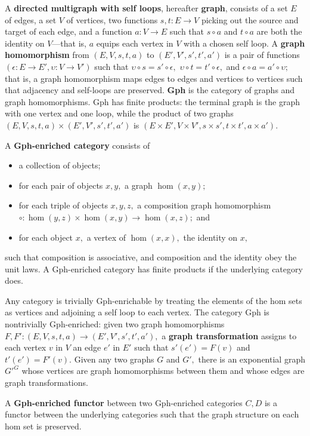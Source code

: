 \documentclass[submission,copyright,creativecommons]{eptcs}
\newcommand{\maps}{\colon}
\begin{document}
A {\bf directed multigraph with self loops}, hereafter {\bf graph}, consists of a set $E$ of edges, a set $V$ of vertices, two functions $s,t\maps E \to V$ picking out the source and target of each edge, and a function $a\maps V \to E$ such that $s\circ a$ and $t \circ a$ are both the identity on $V$---that is, $a$ equips each vertex in $V$ with a chosen self loop.  A {\bf graph homomorphism} from $(E, V, s, t, a)$ to $(E', V', s', t', a')$ is a pair of functions $(\epsilon\maps E \to E', \upsilon\maps V \to V')$ such that $\upsilon\circ s = s' \circ \epsilon,$ $\upsilon\circ t = t' \circ \epsilon,$ and $\epsilon \circ a = a' \circ \upsilon;$ that is, a graph homomorphism maps edges to edges and vertices to vertices such that adjacency and self-loops are preserved.  {\bf Gph} is the category of graphs and graph homomorphisms.  Gph has finite products: the terminal graph is the graph with one vertex and one loop, while the product of two graphs $(E, V, s, t, a) \times (E', V', s', t', a')$ is $(E \times E', V \times V', s \times s', t\times t', a \times a').$

A {\bf Gph-enriched category} consists of
\begin{itemize}
  \item a collection of objects;
  \item for each pair of objects $x, y,$ a graph $\hom(x,y);$
  \item for each triple of objects $x, y, z,$ a composition graph homomorphism $\circ\maps \hom(y, z) \times \hom(x, y) \to \hom(x, z);$ and
  \item for each object $x,$ a vertex of $\hom(x, x),$ the identity on $x,$
\end{itemize}
such that composition is associative, and composition and the identity obey the unit laws.  A Gph-enriched category has finite products if the underlying category does.

Any category is trivially Gph-enrichable by treating the elements of the hom sets as vertices and adjoining a self loop to each vertex.  The category Gph is nontrivially Gph-enriched: given two graph homomorphisms $F, F'\maps (E, V, s, t, a) \to (E', V', s', t', a'),$ a {\bf graph transformation} assigns to each vertex $v$ in $V$ an edge $e'$ in $E'$ such that $s'(e') = F(v)$ and $t'(e') = F'(v).$  Given any two graphs $G$ and $G',$ there is an exponential graph $G'^G$ whose vertices are graph homomorphisms between them and whose edges are graph transformations.

A {\bf Gph-enriched functor} between two Gph-enriched categories $C, D$ is a functor between the underlying categories such that the graph structure on each hom set is preserved.
\end{document}
